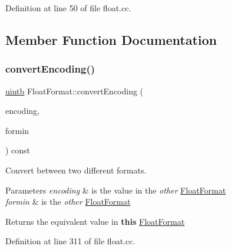 Definition at line 50 of file float.\+cc.



\subsection{Member Function Documentation}
\mbox{\label{class_float_format_a8b9460ada306b44861228990529d5410}} 
\subsubsection{\texorpdfstring{convertEncoding()}{convertEncoding()}}
{\footnotesize\ttfamily \mbox{\hyperlink{types_8h_a2db313c5d32a12b01d26ac9b3bca178f}{uintb}} Float\+Format\+::convert\+Encoding (\begin{DoxyParamCaption}\item[{\mbox{\hyperlink{types_8h_a2db313c5d32a12b01d26ac9b3bca178f}{uintb}}}]{encoding,  }\item[{const \mbox{\hyperlink{class_float_format}{Float\+Format}} $\ast$}]{formin }\end{DoxyParamCaption}) const}



Convert between two different formats. 


\begin{DoxyParams}{Parameters}
{\em encoding} & is the value in the {\itshape other} \mbox{\hyperlink{class_float_format}{Float\+Format}} \\
\hline
{\em formin} & is the {\itshape other} \mbox{\hyperlink{class_float_format}{Float\+Format}} \\
\hline
\end{DoxyParams}
\begin{DoxyReturn}{Returns}
the equivalent value in {\bfseries{this}} \mbox{\hyperlink{class_float_format}{Float\+Format}} 
\end{DoxyReturn}


Definition at line 311 of file float.\+cc.

